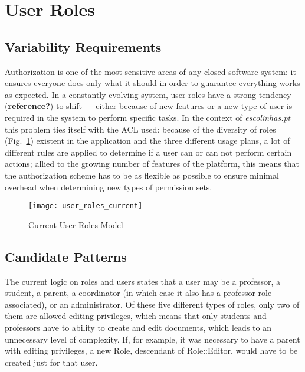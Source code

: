 \section{User Roles}\label{sec:fa_roles}

\subsection{Variability Requirements}\label{sec:fa_roles_variability_requirements}

Authorization is one of the most sensitive areas of any closed software system: it ensures everyone does only what it should in order to guarantee everything works as expected. In a constantly evolving system, user roles have a strong tendency (\textbf{reference?}) to shift --- either because of new features or a new type of user is required in the system to perform specific tasks. In the context of \emph{escolinhas.pt} this problem ties itself with the ACL used: because of the diversity of roles (Fig.~\ref{fig:user_roles_current}) existent in the application and the three different usage plans, a lot of different rules are applied to determine if a user can or can not perform certain actions; allied to the growing number of features of the platform, this means that the authorization scheme has to be as flexible as possible to ensure minimal overhead when determining new types of permission sets.

\begin{figure}[H]
  \centering
  \texttt{[image: user\_roles\_current]}
  \caption{Current User Roles Model}
  \label{fig:user_roles_current}
\end{figure}

\subsection{Candidate Patterns}\label{sec:fa_roles_candidate_patterns}

The current logic on roles and users states that a user may be a professor, a student, a parent, a coordinator (in which case it also has a professor role associated), or an administrator. Of these five different types of roles, only two of them are allowed editing privileges, which means that only students and professors have to ability to create and edit documents, which leads to an unnecessary level of complexity. If, for example, it was necessary to have a parent with editing privileges, a new Role, descendant of Role::Editor, would have to be created just for that user.

